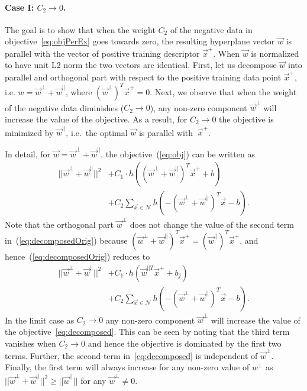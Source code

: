       \paragraph{Case I: $C_2\rightarrow 0$.}
         The goal is to show that when the weight  $C_2$ of the negative data in objective~\eqref{eq:objPerEx} goes towards zero, the resulting hyperplane vector $\vec{w}$ is parallel with the vector of positive training descriptor $\vec{x}^+$. When $\vec{w}$ is normalized to have unit L2 norm the two vectors are identical. First, let us decompose $\vec{w}$ into parallel and orthogonal part with respect to the positive training data point $\vec{x}^+$, i.e. $w = \vec{w}^{\perp} + \vec{w}^{||}$, where $(\vec{w}^{\perp})^T \vec{x}^+ = 0$. Next, we observe that when the weight of the negative data diminishes ($C_2\rightarrow 0$), any non-zero component $\vec{w}^{\perp}$ will increase the value of the objective. As a result, for $C_2\rightarrow 0$ the objective is minimized by $\vec{w}^{||}$, i.e.\ the optimal $\vec{w}$ is parallel with $\
        \vec{x}^+$.

         In detail, for $\vec{w} = \vec{w}^{\perp}+\vec{w}^{||}$, the objective~(\ref{eq:obj}) can be written as
         \begin{align}
            \label{eq:decomposedOrig}
              ||\vec{w}^{\perp}+\vec{w}^{||}||^{2} &+
              C_1 \cdot h
              \left(
               (\vec{w}^{\perp}+\vec{w}^{||})^T \vec{x}^+ + b
              \right) \\ \nonumber
              &+
              C_2\sum_{\vec{x} \in \mathcal N} h
              \left(
               -(\vec{w}^{\perp}+\vec{w}^{||})^T \vec{x} -b
              \right).
         \end{align}
         Note that the orthogonal part $\vec{w}^{\perp}$ does not change the value of  the second term in~(\ref{eq:decomposedOrig}) because $(\vec{w}^{\perp}+\vec{w}^{||})^T \vec{x}^+ = (\vec{w}^{||})^T \vec{x}^+$, and hence~(\ref{eq:decomposedOrig}) reduces to
         \begin{align} 
            \label{eq:decomposed} 
            ||\vec{w}^{\perp}+\vec{w}^{||}||^{2} &+
            C_1 \cdot h
            \left(
                \vec{w}^{||T} \vec{x}^+ +b_j
            \right) \\ \nonumber
            &+
            C_2\sum_{\vec{x} \in \mathcal N} h
            \left(
              -(\vec{w}^{\perp}+\vec{w}^{||})^T \vec{x}-b
            \right).
         \end{align}
         In the limit case as $C_2 \rightarrow 0$ any non-zero component $\vec{w}^{\perp}$
       will increase the value of the objective~\eqref{eq:decomposed}. This can be seen by noting that the third term vanishes when $C_2 \rightarrow 0$ and hence the objective is dominated by the first two terms. Further, the second term in~\eqref{eq:decomposed} is independent of $\vec{w}^{\perp}$. Finally, the first term will always increase for any non-zero value of $w^{\perp}$ as $||\vec{w}^{\perp}+\vec{w}^{||}||^{2} \geq ||\vec{w}^{||}||$ for any $\vec{w}^{\perp}\neq0$.

